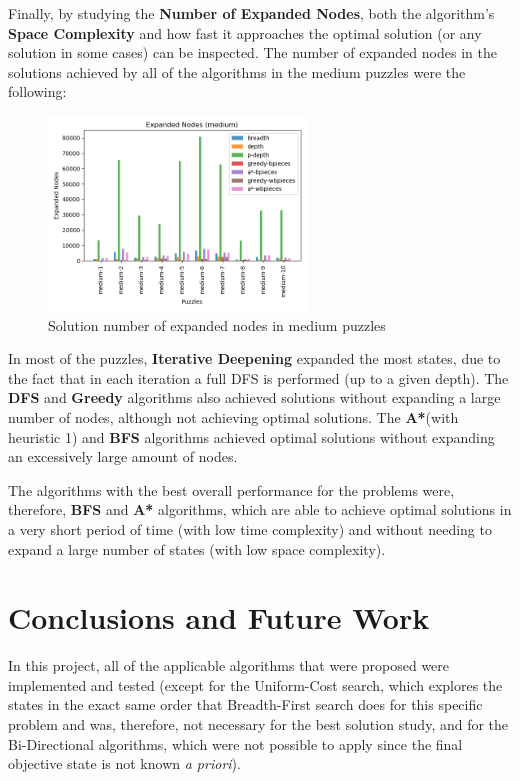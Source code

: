 \documentclass[conference]{IEEEtran}
\begin{document}
Finally, by studying the \textbf{Number of Expanded Nodes}, both the algorithm's \textbf{Space Complexity} and how fast it approaches the optimal solution (or any solution in some cases) can be inspected. The number of expanded nodes in the solutions achieved by all of the algorithms in the medium puzzles were the following:

\begin{figure}[H]
    \centerline{\includegraphics[width=260px]{../../graphics/expandedNodes-medium.png}}
    \caption{Solution number of expanded nodes in medium puzzles}
\end{figure}

In most of the puzzles, \textbf{Iterative Deepening} expanded the most states, due to the fact that in each iteration a full DFS is performed (up to a given depth). The \textbf{DFS} and \textbf{Greedy} algorithms also achieved solutions without expanding a large number of nodes, although not achieving optimal solutions. The \textbf{A*}(with heuristic 1) and \textbf{BFS} algorithms achieved optimal solutions without expanding an excessively large amount of nodes.

The algorithms with the best overall performance for the problems were, therefore, \textbf{BFS} and \textbf{A*} algorithms, which are able to achieve optimal solutions in a very short period of time (with low time complexity) and without needing to expand a large number of states (with low space complexity).

\section{Conclusions and Future Work}
In this project, all of the applicable algorithms that were proposed were implemented and tested (except for the Uniform-Cost search, which explores the states in the exact same order that Breadth-First search does for this specific problem and was, therefore, not necessary for the best solution study, and for the Bi-Directional algorithms, which were not possible to apply since the final objective state is not known \textit{a priori}).
\end{document}
